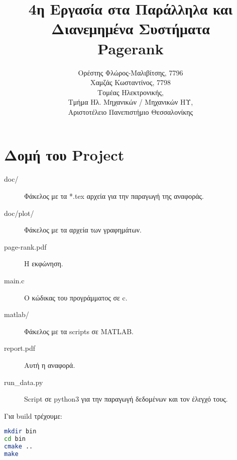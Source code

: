 
\usepackage{fontspec}
\setmainfont{DejaVu Serif}
\renewcommand{\contentsname}{Περιεχόμενα}
\renewcommand{\listfigurename}{Λίστα Σχημάτων}
\renewcommand{\figurename}{Σχήμα}
\renewcommand{\lstlistingname}{Καταχώρηση}
\renewcommand{\lstlistlistingname}{List of \lstlistingname s}

\title{4η Εργασία στα Παράλληλα και Διανεμημένα Συστήματα\\Pagerank}
\author{Ορέστης Φλώρος-Μαλιβίτσης, 7796\\
  Χαμζάς Κωσταντίνος, 7798\\
  Τομέας Ηλεκτρονικής,\\
  Τμήμα Ηλ. Μηχανικών / Μηχανικών ΗΥ,\\
  Αριστοτέλειο Πανεπιστήμιο Θεσσαλονίκης}
  



\maketitle
\tableofcontents
\newpage

\chapter*{Δομή του Project} \label{project-structure}

\begin{description}
	\item[doc/] Φάκελος με τα *.tex αρχεία για την παραγωγή της αναφοράς.
	\item[doc/plot/] Φάκελος με τα αρχεία των γραφημάτων.
	\item[page-rank.pdf] Η εκφώνηση.
	\item[main.c] Ο κώδικας του προγράμματος σε c.
	\item[matlab/] Φάκελος με τα scripts σε MATLAB.
	\item[report.pdf] Αυτή η αναφορά.
	\item[run\_data.py] Script σε python3 για την παραγωγή δεδομένων και τον έλεγχό τους.
\end{description}

\noindent Για build τρέχουμε:
\begin{lstlisting}[language=bash, caption={build commands}, escapechar=$]
mkdir bin
cd bin
cmake ..
make
\end{lstlisting}






